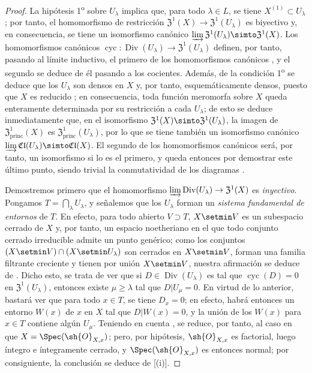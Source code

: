 \begin{proof}
La hipótesis 1\textsuperscript{o} sobre $U_\lambda$ implica que, para todo $\lambda\in L$, se tiene $X^{(1)}\subset U_\lambda$ ; por tanto, el homomorfismo de restricción $\mathfrak{Z}^1(X)\to\mathfrak{Z}^1(U_\lambda)$ es biyectivo y, en consecuencia, se tiene un isomorfismo canónico $\varinjlim\mathfrak{Z}^1(U_\lambda)\simto\mathfrak{Z}^1(X)$.
Los homomorfismos canónicos $\operatorname{cyc}:\operatorname{Div}(U_\lambda)\to\mathfrak{Z}^1(U_\lambda)$ definen, por tanto, pasando al límite inductivo, el primero de los homomorfismos canónicos , y el segundo se deduce de él pasando a los cocientes.
Además, de la condición 1\textsuperscript{o} se deduce que los $U_\lambda$ son densos en $X$ y, por tanto, esquemáticamente densos, puesto que $X$ es reducido ; en consecuencia, toda función meromorfa sobre $X$ queda enteramente determinada por su restricción a cada $U_\lambda$;
de esto se deduce inmediatamente que, en el isomorfismo $\mathfrak{Z}^1(X)\simto\mathfrak{Z}^1(U_\lambda)$, la imagen de $\mathfrak{Z}^1_\mathrm{princ}(X)$ es $\mathfrak{Z}^1_\mathrm{princ}(U_\lambda)$, por lo que se tiene también un isomorfismo canónico $\varinjlim\mathfrak{Cl}(U_\lambda)\simto\mathfrak{Cl}(X)$.
El segundo de los homomorfismos canónicos  será, por tanto, un isomorfismo si lo es el primero, y queda entonces por demostrar este último punto, siendo trivial la conmutatividad de los diagramas .

Demostremos primero que el homomorfismo $\varinjlim\operatorname{Div}(U_\lambda)\to\mathfrak{Z}^1(X)$ es \emph{inyectivo}.
Pongamos $T=\bigcap_\lambda U_\lambda$, y señalemos que los $U_\lambda$ forman un \emph{sistema fundamental de entornos} de $T$.
En efecto, para todo abierto $V\supset T$, $X\setmin V$ es un subespacio cerrado de $X$ y, por tanto, un espacio noetheriano en el que todo conjunto cerrado irreducible admite un punto genérico;
como los conjuntos $(X\setmin V)\cap(X\setmin U_\lambda)$ son cerrados en $X\setmin V$, forman una familia filtrante creciente y tienen por unión $X\setmin V$, nuestra afirmación se deduce de .
Dicho esto, se trata de ver que si $D\in\operatorname{Div}(U_\lambda)$ es tal que $\operatorname{cyc}(D)=0$ en $\mathfrak{Z}^1(U_\lambda)$, entonces existe $\mu\geq\lambda$ tal que $D|U_\mu=0$.
En virtud de lo anterior, bastará ver que para todo $x\in T$, se tiene $D_x=0$;
en efecto, habrá entonces un entorno $W(x)$ de $x$ en $X$ tal que $D|W(x)=0$, y la unión de los $W(x)$ para $x\in T$ contiene algún $U_\mu$.
Teniendo en cuenta , se reduce, por tanto, al caso en que $X=\Spec(\sh{O}_{X,x})$;
pero, por hipótesis, $\sh{O}_{X,x}$ es factorial, luego íntegro e íntegramente cerrado, y $\Spec(\sh{O}_{X,x})$ es entonces normal;
por consiguiente, la conclusión se deduce de [(i)].


\end{proof}
